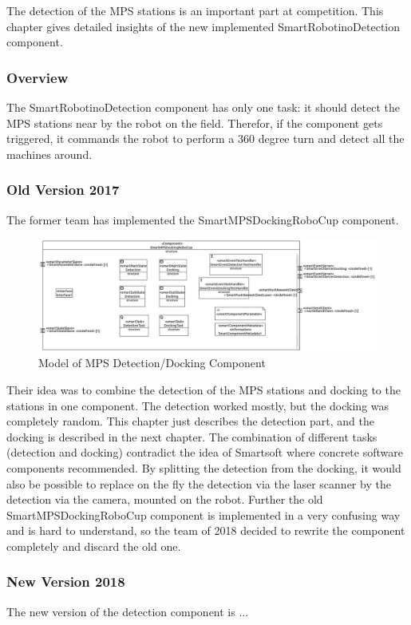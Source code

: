 The detection of the MPS stations is an important part at competition. This chapter gives detailed insights of the new implemented SmartRobotinoDetection component. 


\subsubsection{Overview}

The SmartRobotinoDetection component has only one task: it should detect the MPS stations near by the robot on the field. Therefor, if the component gets triggered, it commands the robot to perform a 360 degree turn and detect all the machines around.

\subsubsection{Old Version 2017}
The former team has implemented the SmartMPSDockingRoboCup component. 

\begin{figure}[h]
\centering
\includegraphics[scale=0.4]{pic/SmartMPSDockingRoboCup.JPG}
\caption{Model of MPS Detection/Docking Component}
\label{fig:i_overview}
\end{figure}

Their idea was to combine the detection of the MPS stations and docking to the stations in one component. The detection worked mostly, but the docking was completely random. This chapter just describes the detection part, and the docking is described in the next chapter. 
The combination of different tasks (detection and docking) contradict the idea of Smartsoft where concrete software components recommended. By splitting the detection from the docking, it would also be possible to replace on the fly the detection via the laser scanner by the detection via the camera, mounted on the robot.
Further the old SmartMPSDockingRoboCup component is implemented in a very confusing way and is hard to understand, so the team of 2018 decided to rewrite the component completely and discard the old one.


\subsubsection{ New Version 2018}
The new version of the detection component is ...


